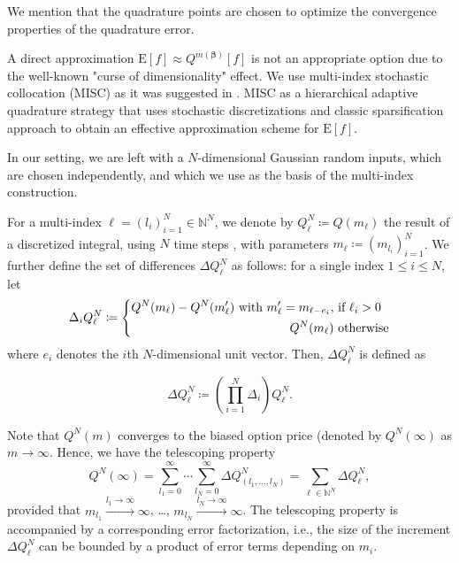 \documentclass[11pt]{article}
\newcommand{\expt}[1]{\mathrm{E}\left[#1\right]}
\newcommand{\nset}{\mathbb{N}}
\begin{document}
We mention that the quadrature points are chosen to optimize the convergence properties of the quadrature error.  

A direct approximation $\expt{f} \approx Q^{m(\boldsymbol{\beta})}[f]$ is not an appropriate option  due to the well-known "curse of dimensionality" effect. We use multi-index stochastic collocation (MISC) as it was suggested  in \cite{haji2016multi}. MISC as a hierarchical adaptive quadrature strategy that uses  stochastic discretizations  and classic sparsification approach to obtain an effective approximation scheme for $\expt{f}$. 


In our setting, we are left with a $N$-dimensional Gaussian random inputs, which are chosen independently, and which we use as the basis of the multi-index construction. 

For a multi-index $\ell = (l_i)_{i=1}^{N} \in \mathbb{N}^{N}$, we denote by
$Q^N_\ell \coloneqq Q(m_{\ell})$ the result of a discretized
integral, using $N$ time steps , with parameters $m_\ell \coloneqq (m_{l_i})_{i=1}^{N}$. We further define the set of
differences $\Delta Q^N_\ell$ as follows: for a single index $1 \le i \le N$,
let
\begin{equation}
\Delta_i Q^N_\ell \coloneqq \left\{ 
\aligned 
Q^N(m_\ell) - Q^N(m_\ell') \text{ with } m_\ell' =
m_{\ell - e_i}, & \text{ if } \ell_i>0 \\
Q^N(m_\ell) & \text{ otherwise}
\endaligned
\right.
\end{equation}
where $e_i$ denotes the $i$th $N$-dimensional unit vector.  Then, $\Delta
Q^N_\ell$ is defined as

%



\begin{equation}
\Delta Q^N_\ell \coloneqq \left( \prod_{i=1}^{N} \Delta_i \right) Q^N_\ell.
\end{equation}


Note that $Q^N(m)$ converges to the biased option price (denoted by $Q^N(\infty)$ as
$m \to \infty$. Hence, we have the telescoping property
\begin{equation}
Q^N(\infty) = \sum_{l_1=0}^\infty \cdots \sum_{l_{N} = 0}^\infty \Delta
Q^N_{(l_1, \ldots, l_{N})} = \sum_{\ell \in \mathbb{N}^{N}} \Delta Q^N_\ell,
\end{equation}
provided that $m_{l_1} \xrightarrow{l_1 \to \infty} \infty$, \ldots,
$m_{l_{N}} \xrightarrow{l_{N} \to \infty} \infty$. The telescoping property
is accompanied by a corresponding error factorization, i.e., the size of the
increment $\Delta Q^N_\ell$ can be bounded by a product of error terms depending
on $m_i$.
\end{document}

